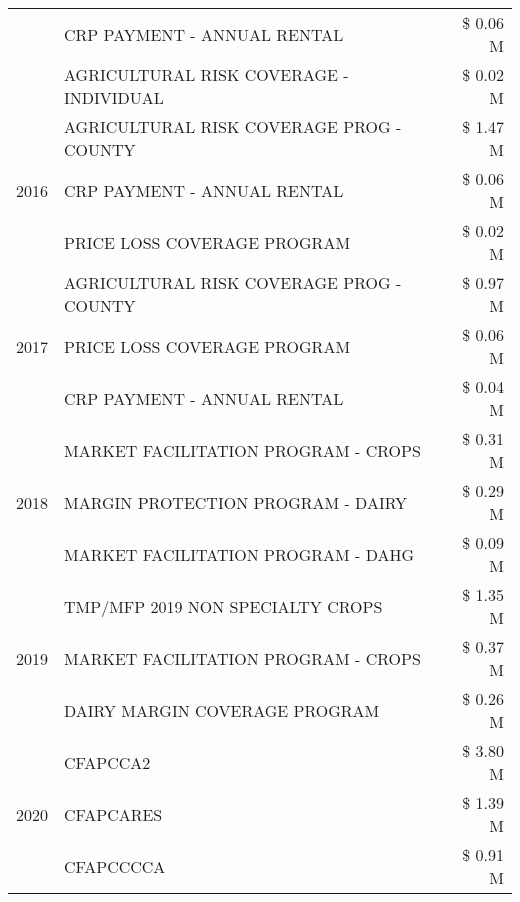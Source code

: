 \begin{tabular}{llr}
 & CRP PAYMENT - ANNUAL RENTAL & \$ 0.06 M \\
 & AGRICULTURAL RISK COVERAGE - INDIVIDUAL & \$ 0.02 M \\
\cline{1-3}
\multirow[t]{3}{*}{2016} & AGRICULTURAL RISK COVERAGE PROG - COUNTY & \$ 1.47 M \\
 & CRP PAYMENT - ANNUAL RENTAL & \$ 0.06 M \\
 & PRICE LOSS COVERAGE PROGRAM & \$ 0.02 M \\
\cline{1-3}
\multirow[t]{3}{*}{2017} & AGRICULTURAL RISK COVERAGE PROG - COUNTY & \$ 0.97 M \\
 & PRICE LOSS COVERAGE PROGRAM & \$ 0.06 M \\
 & CRP PAYMENT - ANNUAL RENTAL & \$ 0.04 M \\
\cline{1-3}
\multirow[t]{3}{*}{2018} & MARKET FACILITATION PROGRAM - CROPS & \$ 0.31 M \\
 & MARGIN PROTECTION PROGRAM - DAIRY & \$ 0.29 M \\
 & MARKET FACILITATION PROGRAM - DAHG & \$ 0.09 M \\
\cline{1-3}
\multirow[t]{3}{*}{2019} & TMP/MFP 2019 NON SPECIALTY CROPS & \$ 1.35 M \\
 & MARKET FACILITATION PROGRAM - CROPS & \$ 0.37 M \\
 & DAIRY MARGIN COVERAGE PROGRAM & \$ 0.26 M \\
\cline{1-3}
\multirow[t]{3}{*}{2020} & CFAPCCA2 & \$ 3.80 M \\
 & CFAPCARES & \$ 1.39 M \\
 & CFAPCCCCA & \$ 0.91 M \\
\cline{1-3}
\bottomrule
\end{tabular}
